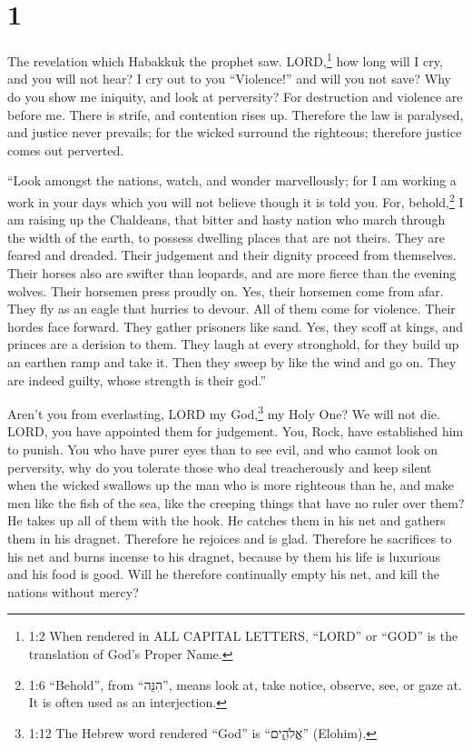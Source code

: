 \hypertarget{section}{%
\section{1}\label{section}}

 The revelation which Habakkuk the prophet saw. 
LORD,\footnote{1:2 When rendered in ALL CAPITAL LETTERS, ``LORD'' or
  ``GOD'' is the translation of God's Proper Name.} how long will I cry,
and you will not hear? I cry out to you ``Violence!'' and will you not
save?  Why do you show me iniquity, and look at perversity?
For destruction and violence are before me. There is strife, and
contention rises up.  Therefore the law is paralysed, and
justice never prevails; for the wicked surround the righteous; therefore
justice comes out perverted.

 ``Look amongst the nations, watch, and wonder marvellously;
for I am working a work in your days which you will not believe though
it is told you.  For, behold,\footnote{1:6 ``Behold'', from
  ``הִנֵּה'', means look at, take notice, observe, see, or gaze at. It
  is often used as an interjection.} I am raising up the Chaldeans, that
bitter and hasty nation who march through the width of the earth, to
possess dwelling places that are not theirs.  They are
feared and dreaded. Their judgement and their dignity proceed from
themselves.  Their horses also are swifter than leopards,
and are more fierce than the evening wolves. Their horsemen press
proudly on. Yes, their horsemen come from afar. They fly as an eagle
that hurries to devour.  All of them come for violence.
Their hordes face forward. They gather prisoners like sand.
 Yes, they scoff at kings, and princes are a derision to
them. They laugh at every stronghold, for they build up an earthen ramp
and take it.  Then they sweep by like the wind and go on.
They are indeed guilty, whose strength is their god.''

 Aren't you from everlasting, LORD my God,\footnote{1:12
  The Hebrew word rendered ``God'' is ``אֱלֹהִ֑ים'' (Elohim).} my Holy
One? We will not die. LORD, you have appointed them for judgement. You,
Rock, have established him to punish.  You who have purer
eyes than to see evil, and who cannot look on perversity, why do you
tolerate those who deal treacherously and keep silent when the wicked
swallows up the man who is more righteous than he,  and
make men like the fish of the sea, like the creeping things that have no
ruler over them?  He takes up all of them with the hook. He
catches them in his net and gathers them in his dragnet. Therefore he
rejoices and is glad.  Therefore he sacrifices to his net
and burns incense to his dragnet, because by them his life is luxurious
and his food is good.  Will he therefore continually empty
his net, and kill the nations without mercy?


